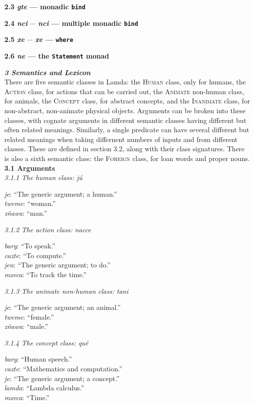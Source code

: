 \documentclass{article}[10pt]
\newcommand{\defarg}[2]{\emph{#1}: ``#2.''\\}
\begin{document}
{\bf 2.3 \emph{gte} --- monadic \texttt{bind}}
 
{\bf 2.4 \emph{nci} $\cdots$ \emph{nci} --- multiple monadic \texttt{bind}}

{\bf 2.5 \emph{xe} $\cdots$ \emph{xe} --- \texttt{where}}

{\bf 2.6 \emph{ne} --- the \texttt{Statement} monad}

\clearpage
{\bf \emph{3 Semantics and Lexicon}}\\

There are five semantic classes in Lamda: the \textsc{Human} class, only for humans, the \textsc{Action} class, for actions that can be carried out, the \textsc{Animate} non-human class, for animals, the \textsc{Concept} class, for abstract concepts, and the \textsc{Inanimate} class, for non-abstract, non-animate physical objects. Arguments can be broken into these classes, with cognate arguments in different semantic classes having different but often related meanings. Similarly, a single predicate can have several different but related meanings when taking differnent numbers of inputs and from different classes. These are defined in section 3.2, along with their class signatures. There is also a sixth semantic class: the \textsc{Foreign} class, for loan words and proper nouns.\\

{\bf 3.1 Arguments}\\

\emph{3.1.1 The human class: \emph{j\'{u}}}
\begin{multicols}{3}
\noindent
\defarg{je}{The generic argument; a human}
\defarg{tweme}{woman}
\defarg{z\~{n}awa}{man}
\end{multicols}

\emph{3.1.2 The action class: \emph{nacce}}
\begin{multicols}{3}
\noindent
\defarg{bary}{To speak}
\defarg{cazte}{To compute}
\defarg{jen}{The generic argument; to do}
\defarg{mxeca}{To track the time}
\end{multicols}

\emph{3.1.3 The animate non-human class: \emph{tani}}
\begin{multicols}{3}
\noindent
\defarg{je}{The generic argument; an animal}
\defarg{tweme}{female}
\defarg{z\~{n}awa}{male}
\end{multicols}

\emph{3.1.4 The concept class: \emph{qu\'{e}}}
\begin{multicols}{3}
\noindent
\defarg{bary}{Human speech}
\defarg{cazte}{Mathematics and computation}
\defarg{je}{The generic argument; a concept}
\defarg{lamda}{Lambda calculus}
\defarg{mxeca}{Time}
\end{multicols}
\end{document}
